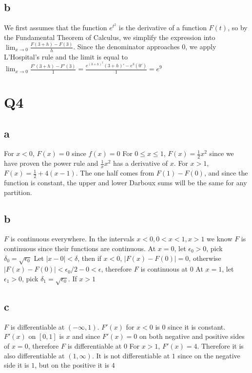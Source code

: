 \documentclass[12pt]{article}
\begin{document}
\subsection{b}
We first assumes that the function $e^{t^2}$ is the derivative of a function $F(t)$, so by the Fundamental Theorem of Calculus, we simplify the expression into $\lim_{x \to 0} \frac{F(3+h)-F(3)}{h}$.
Since the denominator approaches 0, we apply L'Hospital's rule and the limit is equal to $\lim_{x \to 0} \frac{F'(3+h)-F'(3)}{1} = \frac{e^{(3+h)^2}(3+h)'-e^3(0')}{1} = e^9$
\newpage


\section{Q4}
\subsection{a}
For $x < 0$, $F(x)=0$ since $f(x)=0$
\newline
For $0 \leq x \leq 1$, $F(x)=\frac{1}{2}x^2$ since we have proven the power rule and $\frac{1}{x}x^2$ has a derivative of
$x$.
\newline
For $x > 1$, $F(x) = \frac{1}{2} + 4(x-1)$. The one half comes from $F(1)-F(0)$, and since the function is constant, the upper and lower Darboux sums will be the same for any partition.

\subsection{b}
$F$ is continuous everywhere. In the intervals $x<0, 0<x<1, x>1$ we know $F$ is continuous since their functions are continuous. At $x=0$, let $\epsilon_0 > 0$, pick $\delta_0 = \sqrt{\epsilon_0}$
Let $|x-0|<\delta$, then if $x<0$, $|F(x)-F(0)|=0$, otherwise $|F(x)-F(0)| < \epsilon_0/2-0 < \epsilon$, therefore $F$ is continuous at 0
\newline
At $x=1$, let $\epsilon_1 > 0$, pick $\delta_1 = \sqrt{\epsilon_0}$. If $x>1$

\subsection{c}
$F$ is differentiable at $(-\infty, 1)$. $F'(x)$ for $x < 0$ is $0$ since it is constant. $F'(x)$ on $[0,1]$ is $x$ and since $F'(x)=0$ on both negative and positive sides of $x=0$, therefore $F$ is differentiable at $0$
\newline
For $x>1$, $F'(x)= 4$. Therefore it is also differentiable at $(1, \infty)$. It is not differentiable at $1$ since on the negative side it is $1$, but on the positive it is $4$
\newpage
\end{document}
